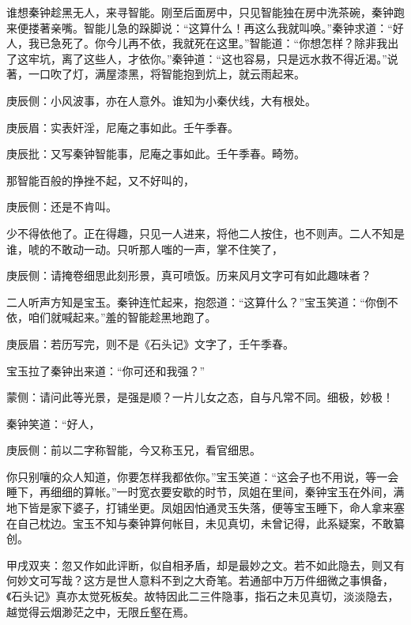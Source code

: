 \begin{parag}
    谁想秦钟趁黑无人，来寻智能。刚至后面房中，只见智能独在房中洗茶碗，秦钟跑来便搂著亲嘴。智能儿急的跺脚说：“这算什么！再这么我就叫唤。”秦钟求道：“好人，我已急死了。你今儿再不依，我就死在这里。”智能道：“你想怎样？除非我出了这牢坑，离了这些人，才依你。”秦钟道：“这也容易，只是远水救不得近渴。”说著，一口吹了灯，满屋漆黑，将智能抱到炕上，就云雨起来。\begin{note}庚辰侧：小风波事，亦在人意外。谁知为小秦伏线，大有根处。\end{note}\begin{note}庚辰眉：实表奸淫，尼庵之事如此。壬午季春。\end{note}\begin{note}庚辰批：又写秦钟智能事，尼庵之事如此。壬午季春。畸笏。\end{note}那智能百般的挣挫不起，又不好叫的，\begin{note}庚辰侧：还是不肯叫。\end{note}少不得依他了。正在得趣，只见一人进来，将他二人按住，也不则声。二人不知是谁，唬的不敢动一动。只听那人嗤的一声，掌不住笑了，\begin{note}庚辰侧：请掩卷细思此刻形景，真可喷饭。历来风月文字可有如此趣味者？\end{note}二人听声方知是宝玉。秦钟连忙起来，抱怨道：“这算什么？”宝玉笑道：“你倒不依，咱们就喊起来。”羞的智能趁黑地跑了。\begin{note}庚辰眉：若历写完，则不是《石头记》文字了，壬午季春。\end{note}宝玉拉了秦钟出来道：“你可还和我强？”\begin{note}蒙侧：请问此等光景，是强是顺？一片儿女之态，自与凡常不同。细极，妙极！\end{note}秦钟笑道：“好人，\begin{note}庚辰侧：前以二字称智能，今又称玉兄，看官细思。\end{note}你只别嚷的众人知道，你要怎样我都依你。”宝玉笑道：“这会子也不用说，等一会睡下，再细细的算帐。”一时宽衣要安歇的时节，凤姐在里间，秦钟宝玉在外间，满地下皆是家下婆子，打铺坐更。凤姐因怕通灵玉失落，便等宝玉睡下，命人拿来塞在自己枕边。宝玉不知与秦钟算何帐目，未见真切，未曾记得，此系疑案，不敢纂创。\begin{note}甲戌双夹：忽又作如此评断，似自相矛盾，却是最妙之文。若不如此隐去，则又有何妙文可写哉？这方是世人意料不到之大奇笔。若通部中万万件细微之事惧备，《石头记》真亦太觉死板矣。故特因此二三件隐事，指石之未见真切，淡淡隐去，越觉得云烟渺茫之中，无限丘壑在焉。\end{note}
\end{parag}


